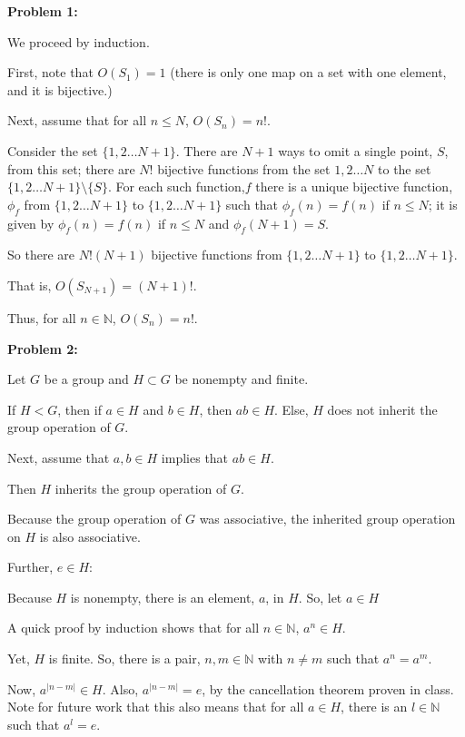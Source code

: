 \documentclass[a4paper,12pt]{article}
\newcommand{\tab}{\hspace{4mm}} %
\newcommand{\shunt}{\vspace{20mm}}
\newcommand{\absval}[1]{\lvert #1 \rvert}
\newcommand{\N}{\mathbb{N}}
\begin{document}
{\bf Problem 1:}


We proceed by induction. 

First, note that $O(S_1) = 1$ (there is only one map on a set with one element, and it is bijective.)

Next, assume that for all $n \leq N$, $O(S_n) = n!$.

\tab Consider the set $\{1, 2 \ldots N+1\}$. There are $N+1$ ways to omit a single point, $S$, from this set; there are $N!$ bijective functions from the set ${1, 2 \ldots N}$ to the set $\{1, 2 \ldots N+1\} \setminus \{S\}$. For each such function,$f$ there is a unique bijective function, $\phi_f$ from $\{1, 2 \ldots N+1\}$ to $\{1, 2 \ldots N+1\}$ such that $\phi_f(n) = f(n)$ if $n \leq N$; it is given by $\phi_f(n) = f(n)$ if $n \leq N$ and $\phi_f(N+1) = S$.

\tab So there are $N!(N+1)$ bijective functions from $\{1, 2 \ldots N+1\}$ to $\{1, 2 \ldots N+1\}$.

\tab That is, $O(S_{N+1}) = (N+1)!$.

Thus, for all $n \in \N$, $O(S_n) = n!$.
\shunt

{\bf Problem 2:}

Let $G$ be a group and $H \subset G$ be nonempty and finite.

If $H < G$, then if $a \in H$ and $b \in H$, then $ab \in H$. Else, $H$ does not inherit the group operation of $G$.

Next, assume that $a,b \in H$ implies that $ab \in H$.

\tab Then $H$ inherits the group operation of $G$.

\tab Because the group operation of $G$ was associative, the inherited group operation on $H$ is also associative.

\tab Further, $e \in H$:

\tab \tab Because $H$ is nonempty, there is an element, $a$, in $H$. So, let $a \in H$

\tab \tab A quick proof by induction shows that for all $n \in \N$, $a^n \in H$.

\tab \tab Yet, $H$ is finite. So, there is a pair, $n, m \in \N$ with $n \neq m$ such that $a^n = a^m$.

\tab \tab Now, $a^{\absval{n-m}} \in H$. Also, $a^{\absval{n-m}} = e$, by the cancellation theorem proven in class. Note for future work that this also means that for all $a \in H$, there is an $l \in \N$ such that $a^l = e$.
\end{document}
